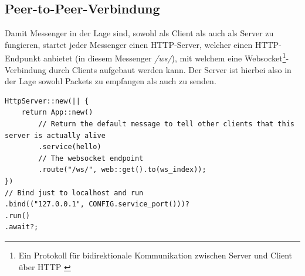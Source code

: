 \documentclass[a4paper,ngerman, headheight=28pt,12pt]{scrartcl}
\newcommand{\vcite}[1]{\cite[vgl.][]{#1}}
\begin{document}
\subsection{Peer-to-Peer-Verbindung}
Damit Messenger in der Lage sind, sowohl als Client als auch als Server zu fungieren, startet jeder Messenger einen HTTP-Server, welcher einen HTTP-Endpunkt anbietet (in diesem Messenger \textit{/ws/}), mit welchem eine Websocket\footnote{%
  Ein Protokoll für bidirektionale Kommunikation zwischen Server und Client über HTTP \vcite{WebsocketDef}}-Verbindung durch Clients aufgebaut werden kann. Der Server ist hierbei also in der Lage sowohl Packets %
zu empfangen als auch zu senden.
\begin{verbatim}
HttpServer::new(|| {
    return App::new()
        // Return the default message to tell other clients that this server is actually alive
        .service(hello)
        // The websocket endpoint
        .route("/ws/", web::get().to(ws_index));
})
// Bind just to localhost and run
.bind(("127.0.0.1", CONFIG.service_port()))?
.run()
.await?;
\end{verbatim}
\end{document}
